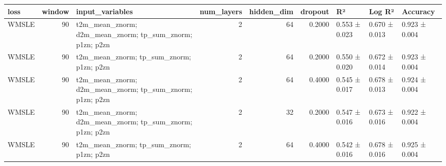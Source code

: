 \begin{tabular}{lrlrrrlll}
\toprule
loss & window & input\_variables & num\_layers & hidden\_dim & dropout & R² & Log R² & Accuracy \\
\midrule
WMSLE & 90 & t2m\_mean\_znorm; d2m\_mean\_znorm; tp\_sum\_znorm; p1zn; p2zn & 2 & 64 & 0.2000 & 0.553 ± 0.023 & 0.670 ± 0.013 & 0.923 ± 0.004 \\
WMSLE & 90 & t2m\_mean\_znorm; tp\_sum\_znorm; p1zn; p2zn & 2 & 64 & 0.2000 & 0.550 ± 0.020 & 0.672 ± 0.014 & 0.923 ± 0.004 \\
WMSLE & 90 & t2m\_mean\_znorm; d2m\_mean\_znorm; tp\_sum\_znorm; p1zn; p2zn & 2 & 64 & 0.4000 & 0.545 ± 0.017 & 0.678 ± 0.013 & 0.924 ± 0.004 \\
WMSLE & 90 & t2m\_mean\_znorm; d2m\_mean\_znorm; tp\_sum\_znorm; p1zn; p2zn & 2 & 32 & 0.2000 & 0.547 ± 0.016 & 0.673 ± 0.016 & 0.922 ± 0.004 \\
WMSLE & 90 & t2m\_mean\_znorm; tp\_sum\_znorm; p1zn; p2zn & 2 & 64 & 0.4000 & 0.542 ± 0.016 & 0.678 ± 0.016 & 0.925 ± 0.004 \\
\bottomrule
\end{tabular}
